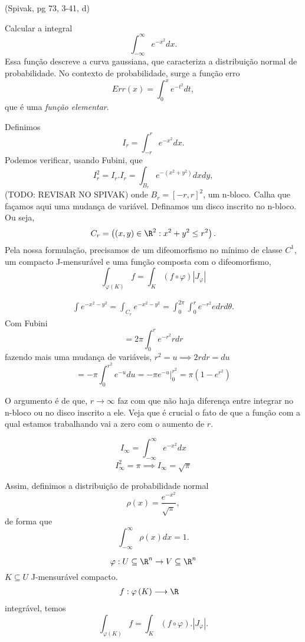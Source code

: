 \begin{eg}
    (Spivak, pg 73, 3-41, d)
    
    Calcular a integral \[
    \int_{-\infty}^{\infty}e^{-x^2} dx
    .\] Essa função descreve a curva gaussiana, que caracteriza a distribuição normal de probabilidade. No contexto de probabilidade, surge a função erro \[
    Err\left( x \right) = \int_0^{x}e^{-t^2} dt
    ,\] que é uma \emph{função elementar}.

    Definimos \[
    I_r = \int_{-r}^{r}e^{-x^2}dx
    .\] Podemos verificar, usando Fubini, que \[
    I_r^2 = I_r . I_r = \int_{B_r} e^{-\left( x^2+y^2 \right) } dx dy
    ,\] (TODO: REVISAR NO SPIVAK) onde $B_r = \left[ -r, r \right] ^2$, um n-bloco. Calha que façamos aqui uma mudança de variável. Definamos um disco inscrito no n-bloco. Ou seja, \[
    C_r = \left( \left( x, y \right) \in \R^2 : x^2 + y^2 \le r^2 \right) 
    .\] Pela nossa formulação, precisamos de um difeomorfismo no mínimo de classe $C^{1}$, um compacto J-mensurável e uma função composta com o difeomorfismo, \[
    \int_{\varphi\left( K \right) } f = \int_K \left( f\circ \varphi \right) \left| J_\varphi \right| 
    \] 

    \begin{align*}
        \int e^{-x^2-y^2} = \int_{C_r}e^{-x^2-y^2} = \int_0^{2\pi}\int_0^{r}e^{-r^2} e dr d\theta
    .\end{align*}
    Com Fubini \[
    = 2\pi \int_0^{r}e^{-r^2}r dr
    \] fazendo mais uma mudança de variáveis, $r^2 = u \implies 2r dr = du$ \[
    = -\pi \int_0^{r^2}e^{-u}du = -\pi e^{-u}\Big|_0^{r^2} = \pi\left( 1-e^{r^2} \right) 
    \] 

    O argumento é de que, $r\to \infty$ faz com que não haja diferença entre integrar no n-bloco ou no disco inscrito a ele. Veja que é crucial o fato de que a função com a qual estamos trabalhando vai a zero com o aumento de $r$.

    \[
    I_{\infty} = \int_{-\infty}^{\infty}e^{-x^2} dx
    \] \[
    I_{\infty}^2 = \pi \implies I_{\infty} = \sqrt{\pi} 
    \]

    Assim, definimos a distribuição de probabilidade normal \[
    \rho\left( x \right) = \frac{e^{-x^2}}{\sqrt{\pi} }
    ,\] de forma que \[
    \int_{-\infty}^{\infty} \rho\left( x \right) dx = 1
    .\] 
\end{eg}


\[
\varphi : U\subseteq\R^{n}\to V\subseteq\R^{n}
\] $K\subseteq U$ J-mensurável compacto.
\begin{align*}
    f: \varphi\left( K \right)  &\longrightarrow \R
\end{align*}
integrável, temos \[
\int_{\varphi\left( K \right) } f = \int_{K}\left( f\circ \varphi \right) .\left| J_\varphi \right| 
.\]

